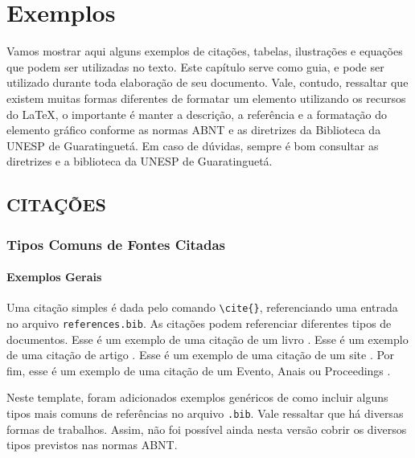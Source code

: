 \documentclass[
  12pt,		%
  a4paper,	%
  openright,%
  oneside,	%
  chapter=TITLE,		%
  section=TITLE,		%
  english,	%
  french,	%
  spanish,	%
  brazil
]{abntex2}
\begin{document}
    
    
    
    \chapter{Exemplos}
    \label{chapter:exemplos}
    
        Vamos mostrar aqui alguns exemplos de citações, tabelas, ilustrações e equações que podem ser utilizadas no texto. Este capítulo serve como guia, e pode ser utilizado durante toda elaboração de seu documento. Vale, contudo, ressaltar que existem muitas formas diferentes de formatar um elemento utilizando os recursos do \LaTeX, o importante é manter a descrição, a referência e a formatação do elemento gráfico conforme as normas ABNT e as diretrizes da Biblioteca da UNESP de Guaratinguetá. Em caso de dúvidas, sempre é bom consultar as diretrizes e a biblioteca da UNESP de Guaratinguetá.
        
         \section{CITAÇÕES}
         
         \subsection{Tipos Comuns de Fontes Citadas}
         
         \subsubsection{Exemplos Gerais}
         
            Uma citação \cite{carbono} simples é dada pelo comando \verb|\cite{}|, referenciando uma entrada no arquivo \verb|references.bib|. As citações podem referenciar diferentes tipos de documentos. Esse é um exemplo de uma citação de um livro \cite{livro}. Esse é um exemplo de uma citação de artigo \cite{artigo}. Esse é um exemplo de uma citação de um site \cite{website}. Por fim, esse é um exemplo de uma citação de um Evento, Anais ou Proceedings \cite{inproceedings}.
            
            Neste template, foram adicionados exemplos genéricos de como incluir alguns tipos mais comuns de referências no arquivo \verb|.bib|. Vale ressaltar que há diversas formas de trabalhos. Assim, não foi possível ainda nesta versão cobrir os diversos tipos previstos nas normas ABNT.
        
\end{document}

